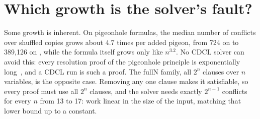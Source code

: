 \section{Which growth is the solver's fault?}
\label{sec:complexity}

Some growth is inherent. On pigeonhole formulas, the median number of
conflicts over shuffled copies grows about 4.7 times per added pigeon, from
724 on  to 389{,}126 on , while the formula
itself grows only like $n^{3.2}$. No CDCL solver can avoid this: every
resolution proof of the pigeonhole principle is exponentially
long~\cite{haken1985}, and a CDCL run is such a proof. The fullN family, all
$2^n$ clauses over $n$ variables, is the opposite case. Removing any one clause
makes it satisfiable, so every proof must use all $2^n$ clauses, and the
solver needs exactly $2^{n-1}$ conflicts for every $n$ from 13 to 17: work
linear in the size of the input, matching that lower bound up to a constant.
